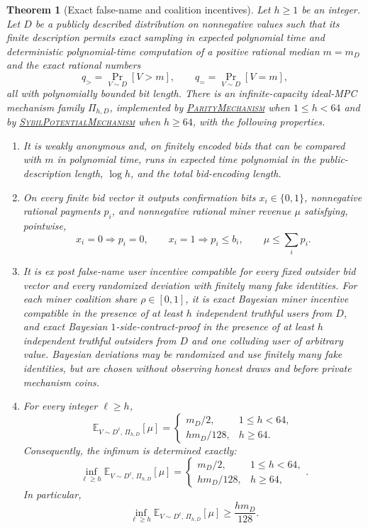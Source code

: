 \documentclass[11pt]{article}
\newtheorem{theorem}{Theorem}[section]
\begin{document}
\begin{theorem}[Exact false-name and coalition incentives]
\label{thm:main}
Let $h\ge1$ be an integer.  Let $D$ be a publicly described distribution on
nonnegative values such that its finite description permits exact sampling in
expected polynomial time and deterministic polynomial-time computation of a
positive rational median $m=m_D$ and the exact rational numbers
\[
q_{>} = \Pr_{V\sim D}[V>m],
\qquad
q_{=} = \Pr_{V\sim D}[V=m],
\]
all with polynomially bounded bit length.  There is an infinite-capacity
ideal-MPC mechanism family $\Pi_{h,D}$, implemented by
\hyperref[alg:parity-mechanism]{\textsc{ParityMechanism}} when $1\le h<64$
and by
\hyperref[alg:sybil-potential-mechanism]{\textsc{SybilPotentialMechanism}}
when $h\ge64$, with the following properties.
\begin{enumerate}
  \item It is weakly anonymous and, on finitely encoded bids that can be
  compared with $m$ in polynomial time, runs in expected time polynomial in
  the public-description length, $\log h$, and the total bid-encoding length.
  \item On every finite bid vector it outputs confirmation bits
  $x_i\in\{0,1\}$, nonnegative rational payments $p_i$, and nonnegative
  rational miner revenue $\mu$ satisfying, pointwise,
  \[
  x_i=0\Longrightarrow p_i=0,
  \qquad
  x_i=1\Longrightarrow p_i\le b_i,
  \qquad
  \mu\le\sum_i p_i.
  \]
  \item It is ex post false-name user incentive compatible for every fixed
  outsider bid vector and every randomized deviation with finitely many fake
  identities.  For each miner coalition share $\rho\in[0,1]$, it is exact
  Bayesian miner incentive compatible in the presence of at least $h$
  independent truthful users from $D$, and exact Bayesian
  $1$-side-contract-proof in the presence of at least $h$ independent
  truthful outsiders from $D$ and one colluding user of arbitrary value.
  Bayesian deviations may be randomized and use finitely many fake
  identities, but are chosen without observing honest draws and before
  private mechanism coins.
  \item For every integer $\ell\ge h$,
  \[
  \mathbb{E}_{V\sim D^\ell,\,\Pi_{h,D}}[\mu]
  =
  \begin{cases}
  m_D/2,&1\le h<64,\\[1ex]
  h m_D/128,&h\ge64.
  \end{cases}
  \]
  Consequently, the infimum is determined exactly:
  \[
  \inf_{\ell\ge h}
  \mathbb{E}_{V\sim D^\ell,\,\Pi_{h,D}}[\mu]
  =
  \begin{cases}
  m_D/2,&1\le h<64,\\[1ex]
  h m_D/128,&h\ge64,
  \end{cases}.
  \]
  In particular,
  \[
  \inf_{\ell\ge h}
  \mathbb{E}_{V\sim D^\ell,\,\Pi_{h,D}}[\mu]
  \ge \frac{h m_D}{128}.
  \]
\end{enumerate}
\end{theorem}
\end{document}
